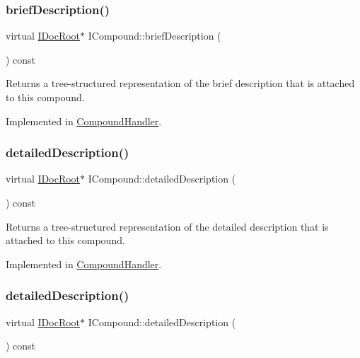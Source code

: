 \subsubsection{\texorpdfstring{briefDescription()}{briefDescription()}\hspace{0.1cm}{\footnotesize\ttfamily [2/2]}}
{\footnotesize\ttfamily virtual \mbox{\hyperlink{class_i_doc_root}{I\+Doc\+Root}}$\ast$ I\+Compound\+::brief\+Description (\begin{DoxyParamCaption}{ }\end{DoxyParamCaption}) const\hspace{0.3cm}{\ttfamily [pure virtual]}}

Returns a tree-\/structured representation of the brief description that is attached to this compound. 

Implemented in \mbox{\hyperlink{class_compound_handler_a082a2132828d9949c5889a7d5a225b01}{Compound\+Handler}}.

\mbox{\label{class_i_compound_a9630b083767887a40040cb4408d538cd}} 
\subsubsection{\texorpdfstring{detailedDescription()}{detailedDescription()}\hspace{0.1cm}{\footnotesize\ttfamily [1/2]}}
{\footnotesize\ttfamily virtual \mbox{\hyperlink{class_i_doc_root}{I\+Doc\+Root}}$\ast$ I\+Compound\+::detailed\+Description (\begin{DoxyParamCaption}{ }\end{DoxyParamCaption}) const\hspace{0.3cm}{\ttfamily [pure virtual]}}

Returns a tree-\/structured representation of the detailed description that is attached to this compound. 

Implemented in \mbox{\hyperlink{class_compound_handler_a59b5dcb1da507d212bfc09323832a7b5}{Compound\+Handler}}.

\mbox{\label{class_i_compound_a9630b083767887a40040cb4408d538cd}} 
\subsubsection{\texorpdfstring{detailedDescription()}{detailedDescription()}\hspace{0.1cm}{\footnotesize\ttfamily [2/2]}}
{\footnotesize\ttfamily virtual \mbox{\hyperlink{class_i_doc_root}{I\+Doc\+Root}}$\ast$ I\+Compound\+::detailed\+Description (\begin{DoxyParamCaption}{ }\end{DoxyParamCaption}) const\hspace{0.3cm}{\ttfamily [pure virtual]}}

